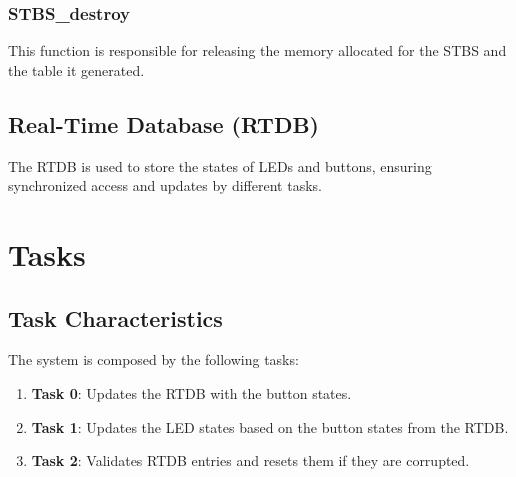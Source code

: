 \documentclass[a4paper,12pt]{article}
\begin{document}
\subsubsection{STBS\_destroy}
This function is responsible for releasing the memory allocated for the STBS and the table it generated.

\subsection{Real-Time Database (RTDB)}
The RTDB is used to store the states of LEDs and buttons, ensuring synchronized access and updates by different tasks.

\section{Tasks}
\subsection{Task Characteristics}
The system is composed by the following tasks:
\begin{enumerate}
    \item \textbf{Task 0}: Updates the RTDB with the button states.
    \item \textbf{Task 1}: Updates the LED states based on the button states from the RTDB.
    \item \textbf{Task 2}: Validates RTDB entries and resets them if they are corrupted.
\end{enumerate}
\end{document}
